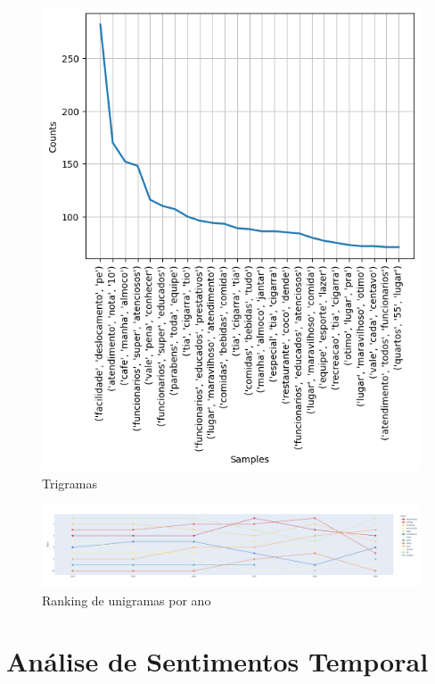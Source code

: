 \begin{figure}
	\centering
	\includegraphics[width=1\textwidth]{figs/exploratoria/trigramas.png}
	\caption{Trigramas}
	\label{img:trigramas}
\end{figure}

\begin{figure}
	\centering
	\includegraphics[width=.7\textwidth]{figs/exploratoria/ranking_unigramas_por_ano.png}
	\caption{Ranking de unigramas por ano}
	\label{img:rank_unigramas}
\end{figure}




\section{Análise de Sentimentos Temporal}
\label{cap:resultados:sec:analise_sentimento}

